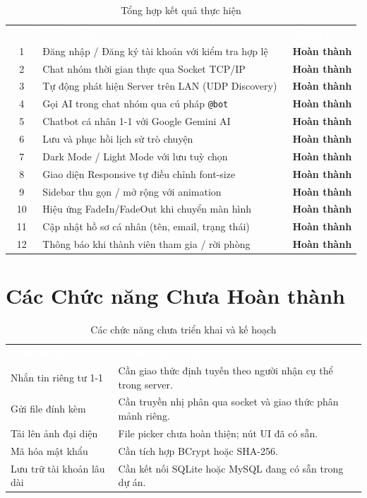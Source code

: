 \documentclass[12pt, a4paper, oneside]{report}
\newcommand{\code}[1]{\texttt{\color{hustblue!80!black}#1}}
\newcommand{\rA}{\rowcolor{rowA}}
\newcommand{\rB}{\rowcolor{rowB}}
\newcommand{\done}{\textcolor{green!60!black}{\textbf{\checkmark\ Hoàn thành}}}
\begin{document}
\begin{table}[H]
  \centering
  \caption{Tổng hợp kết quả thực hiện}
  \label{tab:results}
  \begin{tabularx}{\linewidth}{c X c}
    \rowcolor{headerrow}
    \textcolor{white}{\textbf{STT}} &
    \textcolor{white}{\textbf{Chức năng}} &
    \textcolor{white}{\textbf{Trạng thái}} \\
    \rA 1  & Đăng nhập / Đăng ký tài khoản với kiểm tra hợp lệ & \done \\
    \rB 2  & Chat nhóm thời gian thực qua Socket TCP/IP & \done \\
    \rA 3  & Tự động phát hiện Server trên LAN (UDP Discovery) & \done \\
    \rB 4  & Gọi AI trong chat nhóm qua cú pháp \code{@bot} & \done \\
    \rA 5  & Chatbot cá nhân 1-1 với Google Gemini AI & \done \\
    \rB 6  & Lưu và phục hồi lịch sử trò chuyện & \done \\
    \rA 7  & Dark Mode / Light Mode với lưu tuỳ chọn & \done \\
    \rB 8  & Giao diện Responsive tự điều chỉnh font-size & \done \\
    \rA 9  & Sidebar thu gọn / mở rộng với animation & \done \\
    \rB 10 & Hiệu ứng FadeIn/FadeOut khi chuyển màn hình & \done \\
    \rA 11 & Cập nhật hồ sơ cá nhân (tên, email, trạng thái) & \done \\
    \rB 12 & Thông báo khi thành viên tham gia / rời phòng & \done \\
  \end{tabularx}
\end{table}

\section{Các Chức năng Chưa Hoàn thành}

\begin{table}[H]
  \centering
  \caption{Các chức năng chưa triển khai và kế hoạch}
  \label{tab:todo}
  \begin{tabularx}{\linewidth}{X X}
    \rowcolor{headerrow}
    \textcolor{white}{\textbf{Chức năng}} &
    \textcolor{white}{\textbf{Lý do / Kế hoạch}} \\
    \rA Nhắn tin riêng tư 1-1 &
      Cần giao thức định tuyến theo người nhận cụ thể trong server. \\
    \rB Gửi file đính kèm &
      Cần truyền nhị phân qua socket và giao thức phân mảnh riêng. \\
    \rA Tải lên ảnh đại diện &
      File picker chưa hoàn thiện; nút UI đã có sẵn. \\
    \rB Mã hóa mật khẩu &
      Cần tích hợp BCrypt hoặc SHA-256. \\
    \rA Lưu trữ tài khoản lâu dài &
      Cần kết nối SQLite hoặc MySQL đang có sẵn trong dự án. \\
  \end{tabularx}
\end{table}
\end{document}

